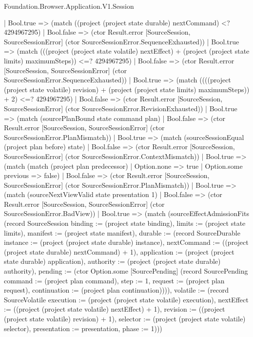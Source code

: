 \begin{lexlean}{Foundation.Browser.Application.V1.Session}
\begin{semanticmodule}
{                      | Bool.true => (match ((project (project state durable) nextCommand) <? 4294967295)
                        | Bool.false => (ctor Result.error [SourceSession, SourceSessionError] (ctor SourceSessionError.SequenceExhausted))
                        | Bool.true => (match (((project (project state volatile) nextEffect) + (project (project state limits) maximumSteps)) <=? 4294967295)
                          | Bool.false => (ctor Result.error [SourceSession, SourceSessionError] (ctor SourceSessionError.SequenceExhausted))
                          | Bool.true => (match ((((project (project state volatile) revision) + (project (project state limits) maximumSteps)) + 2) <=? 4294967295)
                            | Bool.false => (ctor Result.error [SourceSession, SourceSessionError] (ctor SourceSessionError.RevisionExhausted))
                            | Bool.true => (match (sourcePlanBound state command plan)
                              | Bool.false => (ctor Result.error [SourceSession, SourceSessionError] (ctor SourceSessionError.PlanMismatch))
                              | Bool.true => (match (sourceSessionEqual (project plan before) state)
                                | Bool.false => (ctor Result.error [SourceSession, SourceSessionError] (ctor SourceSessionError.ContextMismatch))
                                | Bool.true => (match (match (project plan predecessor)
                                    | Option.none => true
                                    | Option.some previous => false)
                                  | Bool.false => (ctor Result.error [SourceSession, SourceSessionError] (ctor SourceSessionError.PlanMismatch))
                                  | Bool.true => (match (sourceNextViewValid state presentation 1)
                                    | Bool.false => (ctor Result.error [SourceSession, SourceSessionError] (ctor SourceSessionError.BadView))
                                    | Bool.true => (match (sourceEffectAdmissionFits (record SourceSession {binding := (project state binding), limits := (project state limits), manifest := (project state manifest), durable := (record SourceDurable {instance := (project (project state durable) instance), nextCommand := ((project (project state durable) nextCommand) + 1), application := (project (project state durable) application), authority := (project (project state durable) authority), pending := (ctor Option.some [SourcePending] (record SourcePending {command := (project plan command), step := 1, request := (project plan request), continuation := (project plan continuation)}))}), volatile := (record SourceVolatile {execution := (project (project state volatile) execution), nextEffect := ((project (project state volatile) nextEffect) + 1), revision := ((project (project state volatile) revision) + 1), selector := (project (project state volatile) selector), presentation := presentation, phase := 1})}))
}
\end{semanticmodule}
\end{lexlean}
